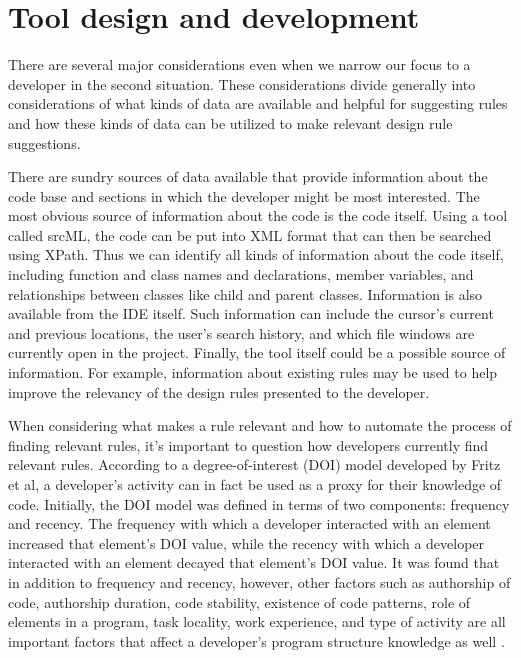 \documentclass[12pt]{article}
\begin{document}
\clearpage


\section{Tool design and development}
There are several major considerations even when we narrow our focus to a developer in the second situation. These considerations divide generally into considerations of what kinds of data are available and helpful for suggesting rules and how these kinds of data can be utilized to make relevant design rule suggestions.

There are sundry sources of data available that provide information about the code base and sections in which the developer might be most interested. The most obvious source of information about the code is the code itself. Using a tool called srcML, the code can be put into XML format that can then be searched using XPath. Thus we can identify all kinds of information about the code itself, including function and class names and declarations, member variables, and relationships between classes like child and parent classes. Information is also available from the IDE itself. Such information can include the cursor's current and previous locations, the user's search history, and which file windows are currently open in the project. Finally, the tool itself could be a possible source of information. For example, information about existing rules may be used to help improve the relevancy of the design rules presented to the developer.

When considering what makes a rule relevant and how to automate the process of finding relevant rules, it's important to question how developers currently find relevant rules. According to a degree-of-interest (DOI) model developed by Fritz et al, a developer's activity can in fact be used as a proxy for their knowledge of code. Initially, the DOI model was defined in terms of two components: frequency and recency. The frequency with which a developer interacted with an element increased that element's DOI value, while the recency with which a developer interacted with an element decayed that element's DOI value. It was found that in addition to frequency and recency, however, other factors such as authorship of code, authorship duration, code stability, existence of code patterns, role of elements in a program, task locality, work experience, and type of activity are all important factors that affect a developer's program structure knowledge as well \cite{FritzEtAl2007}.
\end{document}
